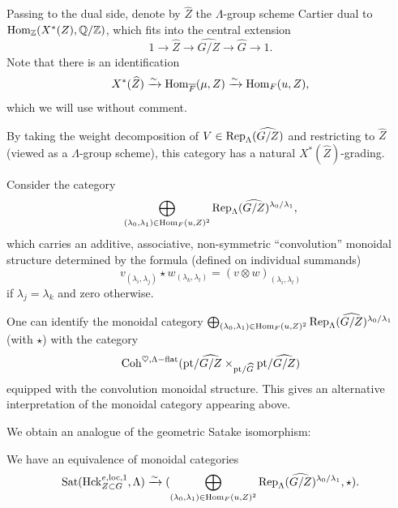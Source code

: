 Passing to the dual side, denote by $\widehat{Z}$ the $\Lambda$-group scheme Cartier dual to $\mathrm{Hom}_{\mathbb{Z}}(X^{*}(Z), \mathbb{Q}/\mathbb{Z})$, which fits into the central extension
\begin{equation*}
    1 \to \widehat{Z} \to \widehat{G/Z} \to \widehat{G} \to 1.
\end{equation*}
 Note that there is an identification
\begin{equation*}
    X^{*}(\widehat{Z}) \xrightarrow{\sim} \mathrm{Hom}_{\overline{F}}(\mu,Z) \xrightarrow{\sim} \mathrm{Hom}_{F}(u,Z),
\end{equation*}
which we will use without comment. 

By taking the weight decomposition of $V \in \mathrm{Rep}_{\Lambda}(\widehat{G/Z})$ and restricting to $\widehat{Z}$ (viewed as a $\Lambda$-group scheme), this category has a natural $X^{*}(\widehat{Z})$-grading.

Consider the category 
\begin{equation*}
\bigoplus_{(\lambda_{0}, \lambda_{1}) \in \mathrm{Hom}_{F}(u, Z)^{2}} \textnormal{Rep}_{\Lambda}(\widehat{G/Z})^{\lambda_{0}/\lambda_{1}},
\end{equation*}
which carries an additive, associative, non-symmetric ``convolution'' monoidal structure determined by the formula (defined on individual summands)
\begin{equation*}
v_{(\lambda_{i},\lambda_{j})} \star w_{(\lambda_{k}, \lambda_{l})} = (v \otimes w)_{(\lambda_{i},\lambda_{l})}
\end{equation*}
if $\lambda_{j} =\lambda_{k}$ and zero otherwise.

\begin{rque}\label{rque:altmonoidal}
One can identify the monoidal category $\bigoplus_{(\lambda_{0}, \lambda_{1}) \in \mathrm{Hom}_{F}(u, Z)^{2}} \textnormal{Rep}_{\Lambda}(\widehat{G/Z})^{\lambda_{0}/\lambda_{1}}$ (with $\star$) with the category 
\begin{equation*}
\mathrm{Coh}^{\heartsuit, \Lambda-\textnormal{flat}}(\mathrm{pt}/\widehat{G/Z} \times_{\mathrm{pt}/\widehat{G}} \mathrm{pt}/\widehat{G/Z})
\end{equation*}
equipped with the convolution monoidal structure. This gives an alternative interpretation of the monoidal category appearing above.
\end{rque}


We obtain an analogue of the geometric Satake isomorphism:

\begin{thm}\label{thm:satake}
    We have an equivalence of monoidal categories
    \begin{equation}\label{eq:pervequiv}
        \textnormal{Sat}(\mathrm{Hck}^{e,\mathrm{loc},1}_{Z \subset G},\Lambda) \xrightarrow{\sim} (\bigoplus_{(\lambda_{0}, \lambda_{1}) \in \mathrm{Hom}_{F}(u, Z)^{2}} \textnormal{Rep}_{\Lambda}(\widehat{G/Z})^{\lambda_{0}/\lambda_{1}},\star).
    \end{equation}
\end{thm}

